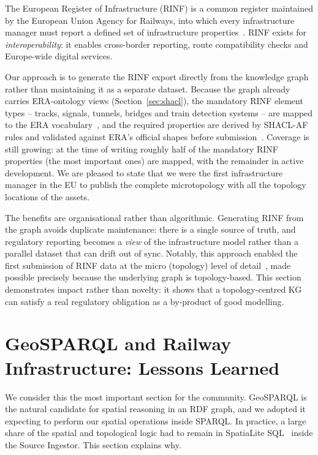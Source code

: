\documentclass[twocolumn]{ceurart}
\begin{document}
The European Register of Infrastructure (RINF) is a common register maintained
by the European Union Agency for Railways, into which every infrastructure
manager must report a defined set of infrastructure
properties~\cite{rinf,rinf_reg}. RINF exists for \emph{interoperability}: it
enables cross-border reporting, route compatibility checks and Europe-wide
digital services.

Our approach is to generate the RINF export directly from the knowledge graph
rather than maintaining it as a separate dataset. Because the graph already
carries ERA-ontology views (Section~\ref{sec:shacl}), the mandatory RINF element
types -- tracks, signals, tunnels, bridges and train detection systems -- are
mapped to the ERA vocabulary~\cite{eraontology}, and the required properties are
derived by SHACL-AF rules and validated against ERA's official shapes before
submission~\cite{dim}. Coverage is still growing: at the time of writing roughly
half of the mandatory RINF properties (the most important ones) are mapped, 
with the remainder in active development. We are pleased to state that we were the
first infrastructure manager in the EU to publish the complete microtopology with 
all the topology locations of the assets.

The benefits are organisational rather than algorithmic. Generating RINF from
the graph avoids duplicate maintenance: there is a single source of truth, and
regulatory reporting becomes a \emph{view} of the infrastructure model rather
than a parallel dataset that can drift out of sync. Notably, this approach
enabled the first submission of RINF data at the micro (topology) level of
detail~\cite{dim}, made possible precisely because the underlying graph is
topology-based. This section demonstrates impact rather than novelty: it shows
that a topology-centred KG can satisfy a real regulatory obligation as a
by-product of good modelling.

\section{GeoSPARQL and Railway Infrastructure: Lessons Learned}
\label{sec:geosparql}

We consider this the most important section for the community. GeoSPARQL is the
natural candidate for spatial reasoning in an RDF graph, and we adopted it
expecting to perform our spatial operations inside SPARQL. In practice, a large
share of the spatial and topological logic had to remain in SpatiaLite
SQL~\cite{spatialite} inside the Source Ingestor. This section explains why.
\end{document}
